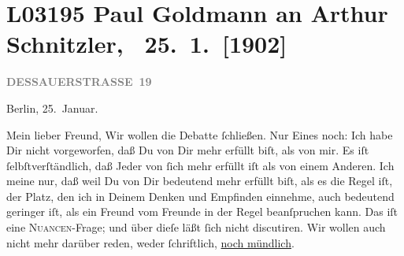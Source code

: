 

\section[ Paul Goldmann an Arthur Schnitzler, 25. 1. {[}1902{]}]{L03195 Paul Goldmann an Arthur Schnitzler,  25. 1. {[}1902{]}}
\nopagebreak{}
\rehead{ }\normalsize\beginnumbering{}
\toendnotes[C]{\smallbreak\pagebreak[2]}
\toendnotes[C]{\smallbreak}
\toendnotes[C]{\smallbreak}
\pstart
           \raggedleft{}{\pb}\textcolor{gray}{\textbf{DESSAUERSTRASSE 19}}\pend
           
\pstart
           Berlin, 25. Januar.\pend
           
\pstart\center{}Mein lieber Freund,\pend\vspace{0.5em}
\pstart
           Wir wollen die Debatte{ }ſchließen. Nur Eines noch: Ich habe Dir nicht vorgeworfen, daß
               Du von Dir mehr erfüllt biſt, als von mir. Es iſt{ }ſelbſtverſtändlich, daß Jeder von{ }ſich mehr erfüllt iſt als von einem Anderen. Ich meine nur, daß \strikeout{\textcolor{gray}{ich in Deinen}} weil Du von Dir bedeutend mehr erfüllt biſt, als es die Regel iſt, der Platz,
               den ich in Deinem Denken und Empfinden einnehme, auch bedeutend geringer iſt, als ein
               Freund vom Freunde in der Regel beanſpruchen kann. Das iſt eine \textsc{Nuancen}-Frage; und über dieſe läßt{ }ſich nicht discutiren. Wir wollen auch
               nicht mehr darüber reden, weder{ }ſchriftlich, \uline{noch
                  mündlich}.\pend
           
